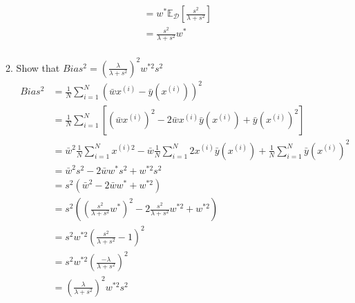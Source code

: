 \documentclass{article}
\theoremstyle{definition}
\theoremstyle{remark}
\begin{document}
\begin{enumerate}[font={\Large\bfseries},left=0pt]
\begin{enumerate}
\begin{align}
			              & = w^*\mathbb{E}_\mathcal{D}\left[\frac{s^2}{\lambda + s^2}\right]                                                                                                                                                                                                                    \\
			              & = \frac{s^2}{\lambda + s^2}w^*                                                                                                                                                                                                                                                       \\
		      \end{align}

		\item Show that $Bias^2 = \left( \frac{\lambda}{\lambda + s^2}\right)^2 w^{*2} s^2$
		      \begin{align}
			      Bias^2 & = \frac{1}{N} \sum_{i=1}^N (\bar{w}x^{(i)} - \bar{y}(x^{(i)}))^2                                                                                        \\[2pt]
			             & = \frac{1}{N} \sum_{i=1}^N \left[ (\bar{w}x^{(i)})^2 - 2\bar{w}x^{(i)}\bar{y}(x^{(i)}) + \bar{y}(x^{(i)})^2 \right]                                     \\[2pt]
			             & = \bar{w}^2  \frac{1}{N} \sum_{i=1}^N x^{(i)2} - \bar{w}\frac{1}{N} \sum_{i=1}^N 2x^{(i)}\bar{y}(x^{(i)}) + \frac{1}{N} \sum_{i=1}^N \bar{y}(x^{(i)})^2 \\[2pt]
			             & = \bar{w}^2  s^2 - 2\bar{w}w^*s^2 + w^{*2}s^2                                                                                                           \\[2pt]
			             & = s^2 \left(\bar{w}^2  - 2\bar{w}w^* + w^{*2}\right)                                                                                                    \\[2pt]
			             & = s^2 \left(\left( \frac{s^2}{\lambda + s^2}w^* \right)^2  - 2\frac{s^2}{\lambda + s^2}w^{*2} + w^{*2}\right)                                           \\[2pt]
			             & = s^2 w^{*2}\left(\frac{s^2}{\lambda + s^2} - 1\right)^2                                                                                                \\[2pt]
			             & = s^2 w^{*2}\left(\frac{-\lambda}{\lambda + s^2} \right)^2                                                                                              \\[2pt]
			             & = \left(\frac{\lambda}{\lambda + s^2} \right)^2w^{*2}s^2
		      \end{align}


\end{enumerate}
\end{enumerate}
\end{document}
